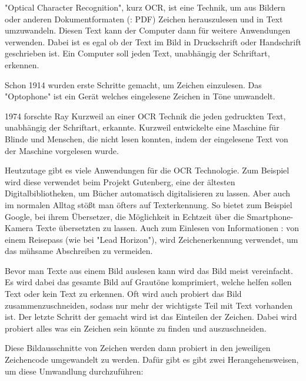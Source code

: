 \label{sec:ocr}


"Optical Character Recognition", kurz OCR, ist eine Technik, um aus Bildern oder anderen Dokumentformaten (\zb: PDF) Zeichen herauszulesen und in Text umzuwandeln. Diesen Text kann der Computer dann für weitere Anwendungen verwenden. Dabei ist es egal ob der Text im Bild in Druckschrift oder Handschrift geschrieben ist. Ein Computer soll jeden Text, unabhängig der Schriftart, erkennen.
\cite{OCRIntro}


Schon 1914 wurden erste Schritte gemacht, um Zeichen einzulesen. Das "Optophone" ist ein Gerät welches eingelesene Zeichen in Töne umwandelt.\cite{OCRRecognition}

1974 forschte Ray Kurzweil an einer OCR Technik die jeden gedruckten Text, unabhängig der Schriftart, erkannte. Kurzweil entwickelte eine Maschine für Blinde und Menschen, die nicht lesen konnten, indem der eingelesene Text von der Maschine vorgelesen wurde.\cite{OCRRecognition}

Heutzutage gibt es viele Anwendungen für die OCR Technologie. Zum Beispiel wird diese verwendet beim Projekt Gutenberg, eine der ältesten Digitalbibliotheken, um Bücher automatisch digitalisieren zu lassen. Aber auch im normalen Alltag stößt man öfters auf Texterkennung. So bietet zum Beispiel Google, bei ihrem Übersetzer, die Möglichkeit in Echtzeit über die Smartphone-Kamera Texte übersetzten zu lassen. Auch zum Einlesen von Informationen \zb: von einem Reisepass (wie bei "Lead Horizon"), wird Zeichenerkennung verwendet, um das mühsame Abschreiben zu vermeiden.


Bevor man Texte aus einem Bild auslesen kann wird das Bild meist vereinfacht. Es wird dabei das gesamte Bild auf Grautöne komprimiert, welche helfen sollen Text oder kein Text zu erkennen. Oft wird auch probiert das Bild zusammenzuschneiden, sodass nur mehr der wichtigste Teil mit Text vorhanden ist. Der letzte Schritt der gemacht wird ist das Einteilen der Zeichen. Dabei wird probiert alles was ein Zeichen sein könnte zu finden und auszuschneiden.\cite{OCRPreProcessing}

Diese Bildausschnitte von Zeichen werden dann probiert in den jeweiligen Zeichencode umgewandelt zu werden. Dafür gibt es gibt zwei Herangehensweisen, um diese Umwandlung durchzuführen:

